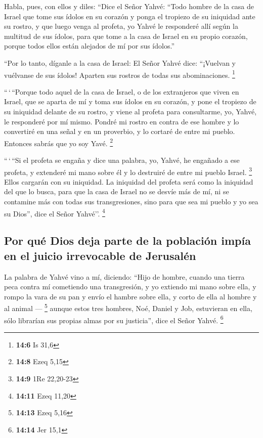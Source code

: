 \begin{paracol}{2}
 Habla, pues, con ellos y diles: ``Dice el Señor Yahvé:
``Todo hombre de la casa de Israel que tome sus ídolos en su corazón y
ponga el tropiezo de su iniquidad ante su rostro, y que luego venga al
profeta, yo Yahvé le responderé allí según la multitud de sus ídolos,
 para que tome a la casa de Israel en su propio corazón,
porque todos ellos están alejados de mí por sus ídolos.''

 ``Por lo tanto, díganle a la casa de Israel: El Señor
Yahvé dice: ``¡Vuelvan y vuélvanse de sus ídolos! Aparten sus rostros de
todas sus abominaciones. \footnote{\textbf{14:6} Is 31,6}

 ``\,`\,``Porque todo aquel de la casa de Israel, o de los
extranjeros que viven en Israel, que se aparta de mí y toma sus ídolos
en su corazón, y pone el tropiezo de su iniquidad delante de su rostro,
y viene al profeta para consultarme, yo, Yahvé, le responderé por mí
mismo.  Pondré mi rostro en contra de ese hombre y lo
convertiré en una señal y en un proverbio, y lo cortaré de entre mi
pueblo. Entonces sabrás que yo soy Yavé. \footnote{\textbf{14:8} Ezeq
  5,15}

 ``\,`\,``Si el profeta se engaña y dice una palabra, yo,
Yahvé, he engañado a ese profeta, y extenderé mi mano sobre él y lo
destruiré de entre mi pueblo Israel. \footnote{\textbf{14:9} 1Re
  22,20-23}  Ellos cargarán con su iniquidad. La
iniquidad del profeta será como la iniquidad del que lo busca,
 para que la casa de Israel no se desvíe más de mí, ni se
contamine más con todas sus transgresiones, sino para que sea mi pueblo
y yo sea su Dios'', dice el Señor Yahvé''. \footnote{\textbf{14:11} Ezeq
  11,20}

\hypertarget{por-quuxe9-dios-deja-parte-de-la-poblaciuxf3n-impuxeda-en-el-juicio-irrevocable-de-jerusaluxe9n}{%
\subsection{Por qué Dios deja parte de la población impía en el juicio
irrevocable de
Jerusalén}\label{por-quuxe9-dios-deja-parte-de-la-poblaciuxf3n-impuxeda-en-el-juicio-irrevocable-de-jerusaluxe9n}}

 La palabra de Yahvé vino a mí, diciendo: 
``Hijo de hombre, cuando una tierra peca contra mí cometiendo una
transgresión, y yo extiendo mi mano sobre ella, y rompo la vara de su
pan y envío el hambre sobre ella, y corto de ella al hombre y al animal
--- \footnote{\textbf{14:13} Ezeq 5,16}  aunque estos
tres hombres, Noé, Daniel y Job, estuvieran en ella, sólo librarían sus
propias almas por su justicia'', dice el Señor Yahvé. \footnote{\textbf{14:14}
  Jer 15,1}


\end{paracol}
